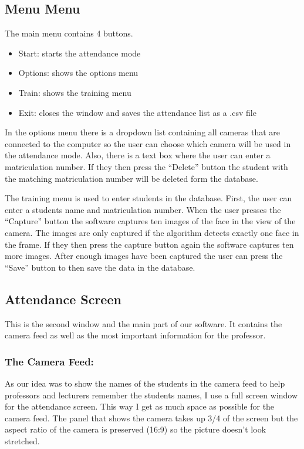 \documentclass[12pt, a4paper]{article}
\begin{document}
\subsection{Menu Menu}
The main menu contains 4 buttons.
\begin{itemize}
\item Start: starts the attendance mode
\item Options: shows the options menu
\item Train: shows the training menu
\item Exit: closes the window and saves the attendance list as a .csv file
\end{itemize}

In the options menu there is a dropdown list containing all cameras that are connected to the computer so the user can choose which camera will be used in the attendance mode. Also, there is a text box where the user can enter a matriculation number. If they then press the “Delete” button the student with the matching matriculation number will be deleted form the database. 

The training menu is used to enter students in the database. First, the user can enter a students name and matriculation number.  When the user presses the “Capture” button the software captures ten images of the face in the view of the camera. The images are only captured if the algorithm detects exactly one face in the frame. If they then press the capture button again the software captures ten more images. After enough images have been captured the user can press the “Save” button to then save the data in the database. 

\subsection{Attendance Screen}
This is the second window and the main part of our software. It contains the camera feed as well as the most important information for the professor.

\subsubsection{The Camera Feed:}
As our idea was to show the names of the students in the camera feed to help professors and lecturers remember the students names, I use a full screen window for the attendance screen. This way I get as much space as possible for the camera feed. The panel that shows the camera takes up 3/4 of the screen but the aspect ratio of the camera is preserved (16:9) so the picture doesn’t look stretched. 
\end{document}
